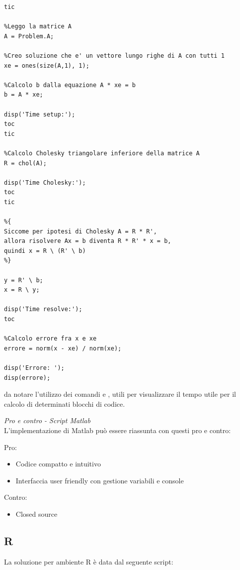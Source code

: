\documentclass[preprint,12pt]{elsarticle}
\begin{document}
\begin{lstlisting}
tic

%Leggo la matrice A
A = Problem.A;

%Creo soluzione che e' un vettore lungo righe di A con tutti 1
xe = ones(size(A,1), 1);

%Calcolo b dalla equazione A * xe = b
b = A * xe;

disp('Time setup:');
toc
tic

%Calcolo Cholesky triangolare inferiore della matrice A 
R = chol(A);

disp('Time Cholesky:');
toc
tic

%{
Siccome per ipotesi di Cholesky A = R * R',
allora risolvere Ax = b diventa R * R' * x = b,
quindi x = R \ (R' \ b)
%}

y = R' \ b;
x = R \ y;

disp('Time resolve:');
toc

%Calcolo errore fra x e xe
errore = norm(x - xe) / norm(xe);

disp('Errore: ');
disp(errore);

\end{lstlisting}

da notare l'utilizzo dei comandi  e , utili per visualizzare il tempo utile per il calcolo di determinati blocchi di codice.
\linebreak


\textit{Pro e contro - Script Matlab}\\
\vspace{4mm}
L'implementazione di Matlab può essere riassunta con questi pro e contro:

Pro:
\begin{itemize}
	\item Codice compatto e intuitivo
	\item Interfaccia user friendly con gestione variabili e console
\end{itemize}

Contro:
\begin{itemize}
	\item Closed source
\end{itemize}

\newpage

\subsection{R}

La soluzione per ambiente R è data dal seguente script:
\end{document}
